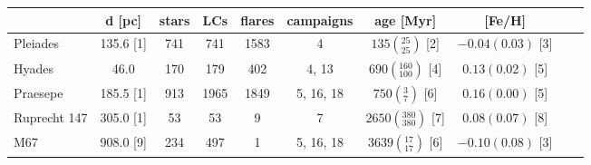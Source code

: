 \begin{tabular}{lccccccccr}
\hline\hline
          &  d [pc] &  stars &   LCs &  flares &    campaigns &                        age [Myr] &         [Fe/H] \\
\hline
 Pleiades &   135.6 [1] &    741 &   741 &    1583 &            4 &     $135\left(_{25}^{25}\right)$ [2]&  $-0.04(0.03)$ [3] \\
   Hyades &    46.0 &    170 &   179 &     402 &      4, 13 &   $690\left(_{100}^{160}\right)$ [4] &   $0.13(0.02)$ [5]\\
 Praesepe &   185.5 [1]&    913 &  1965 &    1849 &  5, 16, 18 &       $750\left(_{7}^{3}\right)$ [6]&   $0.16(0.00)$ [5]\\
  Ruprecht 147 &   305.0 [1]&     53 &    53 &       9 &            7 &  $2650\left(_{380}^{380}\right)$ [7]&   $0.08(0.07)$ [8] \\
      M67 &   908.0 [9]&    234 &   497 &       1 &  5, 16, 18 &    $3639\left(_{17}^{17}\right)$ [6]&  $-0.10(0.08)$ [3]\\
\hline

\end{tabular}
